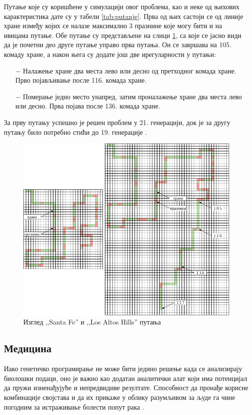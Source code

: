 \documentclass[a4paper]{article}
\begin{document}
Путање које су коришћене у симулацији овог проблема, као и неке од њихових карактеристика дате су у табели \ref{tab:putanje}. Прва од њих састоји се од линије хране између којих се налазе максимално 3 празнине које могу бити и на ивицама путање. Обе путање су представљене на слици \ref{fig:santa_fe}, са које се јасно види да је почетни део друге путање управо прва путања. Он се завршава на 105. комаду хране, а након њега су додате још две ирегуларности у путањи:
\begin{itemize}
    \item[$-$] Налажење хране два места лево или десно од претходног комада хране. Прво појављивање после 116. комада хране.
    \item[$-$] Померање једно место унапред, затим проналажење хране два места лево или десно. Прва појава после 136. комада хране.
\end{itemize}

За прву путању успешно је решен проблем у 21. генерацији, док је за другу путању било потребно стићи до 19. генерације \cite{koza}.

\begin{figure}[ht!]
    \begin{center}
        \includegraphics[scale=0.35]{santa_fe.png}
    \end{center}
    \caption{Изглед ,,Santa Fe'' и ,,Los Altos Hills'' путања}
    \label{fig:santa_fe}
\end{figure}

\subsection{Медицина}
Иако генетичко програмирање не може бити једино решење када се анализирају биолошки подаци, оно је важно као додатан аналитички алат који има потенцијал да пружи изненађујуће и непредвидиве резултате. Способност да пронађе корисне комбинације својстава и да их прикаже у облику разумљивом за људе га чине погодним за истраживање болести попут рака \cite{cancer}.
\end{document}
